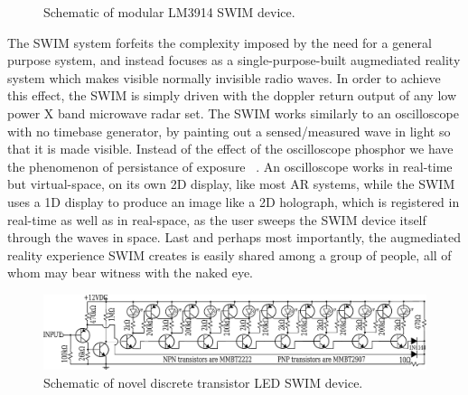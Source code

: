 \documentclass[conference]{sig-alternate-05-2015}
\begin{document}
\begin{figure}
\caption{\label{fig:frog}Schematic of modular LM3914 SWIM device.}
\end{figure}
The SWIM system forfeits the complexity imposed by the need for a general purpose system, and instead focuses as a single-purpose-built augmediated reality system which makes visible normally invisible radio waves. In order to achieve this effect, the SWIM is simply driven with the doppler return output of any low power X band microwave radar set.
The SWIM works similarly to an oscilloscope with no timebase generator, by painting out a sensed/measured wave in light so that it is made visible. Instead of the effect of the oscilloscope phosphor we have the phenomenon of persistance of exposure ~\cite{mann2015phenomenal}. An oscilloscope works in real-time but virtual-space, on its own 2D display, like most AR systems, while the SWIM uses a 1D display to produce an image like a 2D holograph, which is registered in real-time as well as in real-space, as the user sweeps the SWIM device itself through the waves in space. 
Last and perhaps most importantly, the augmediated reality experience SWIM creates is easily shared among a group of people, all of whom may bear witness with the naked eye.
\begin{figure}
\centering
\includegraphics[width=\textwidth]{schematic.pdf}
\caption{\label{fig:frog}Schematic of  novel discrete transistor LED SWIM device.}
\end{figure}
\end{document}
